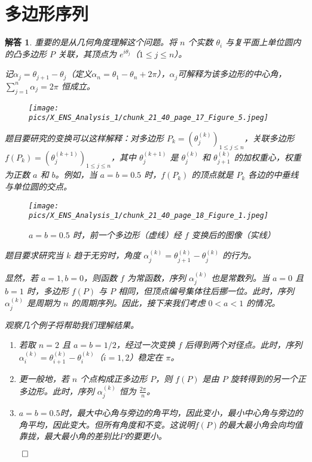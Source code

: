 \documentclass[12pt,UTF8]{ctexbook}
\theoremstyle{exercisestyle}
\theoremstyle{solutionstyle}
\newtheorem*{solution*}{解答}
\newenvironment{solution}
  {\begin{solution*}}
  {\hfill\ensuremath{\qed}\end{solution*}}
\begin{document}
\section{多边形序列}
\begin{solution}
重要的是从几何角度理解这个问题。将 \(n\) 个实数 \(\theta_i\) 与复平面上单位圆内的凸多边形 \(P\) 关联，其顶点为 \(e^{i\theta_j}\)（\(1 \leq j \leq n\)）。

记\(\alpha_j = \theta_{j+1} - \theta_j\)（定义\(\alpha_n = \theta_1 - \theta_n + 2\pi\)），$\alpha_j$可解释为该多边形的中心角， \(\sum_{j=1}^{n} \alpha_j = 2\pi\) 恒成立。
\begin{figure}[htbp]
    \centering
    \texttt{[image: pics/X\_ENS\_Analysis\_1/chunk\_21\_40\_page\_17\_Figure\_5.jpeg]}
\end{figure}

题目要研究的变换可以这样解释：对多边形 \(P_k = (\theta_j^{(k)})_{1 \leq j \leq n}\)，关联多边形 \(f(P_k) = (\theta_j^{(k+1)})_{1 \leq j \leq n}\)，其中 \(\theta_j^{(k+1)}\) 是 \(\theta_j^{(k)}\) 和 \(\theta_{j+1}^{(k)}\) 的加权重心，权重为正数 \(a\) 和 \(b\)。例如，当 \(a = b = 0.5\) 时，\(f(P_k)\) 的顶点就是 \(P_k\) 各边的中垂线与单位圆的交点。
\begin{figure}[htbp]
    \centering
    \texttt{[image: pics/X\_ENS\_Analysis\_1/chunk\_21\_40\_page\_18\_Figure\_1.jpeg]}
    \caption*{ \(a = b =0.5\) 时，前一个多边形（虚线）经 \(f\) 变换后的图像（实线）}
\end{figure}

题目要求研究当 \(k\) 趋于无穷时，角度 \(\alpha_j^{(k)} = \theta_{j+1}^{(k)} - \theta_j^{(k)}\) 的行为。

显然，若 \(a = 1, b = 0\)，则函数 \(f\) 为常函数，序列 \(\alpha_j^{(k)}\) 也是常数列。当 \(a = 0\) 且 \(b = 1\) 时，多边形 \(f(P)\) 与 \(P\) 相同，但顶点编号集体往后挪一位。此时，序列 \(\alpha_j^{(k)}\) 是周期为 \(n\) 的周期序列。因此，接下来我们考虑 \(0 < a < 1\) 的情况。

观察几个例子将帮助我们理解结果。
\begin{enumerate}[label=\arabic*.]
  \item 若取 \(n = 2\) 且 \(a = b = 1/2\)，经过一次变换 \(f\) 后得到两个对径点。此时，序列 \(\alpha_i^{(k)} = \theta_{i+1}^{(k)} - \theta_i^{(k)}\)（\(i = 1, 2\)）稳定在 \(\pi\)。
  \item 更一般地，若 \(n\) 个点构成正多边形 \(P\)，则 \(f(P)\) 是由 \(P\) 旋转得到的另一个正多边形。此时，序列 \(\alpha_j^{(k)}\) 恒为 \(\frac{2\pi}{n}\)。
  \item $a = b = 0.5$时，最大中心角与旁边的角平均，因此变小，最小中心角与旁边的角平均，因此变大。但所有角度和不变。这说明$f(P)$的最大最小角会向均值靠拢，最大最小角的差别比$P$的要更小。
\end{enumerate}


\end{solution}
\end{document}
